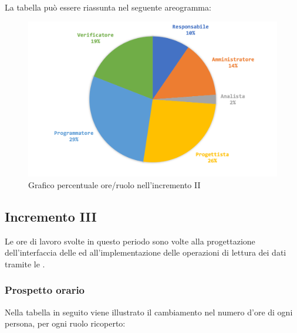 			La tabella può essere riassunta nel seguente areogramma:
			\begin{figure}[H]
				\centering
				\includegraphics[width=0.8\linewidth]{images/consuntivo/ConsIncr2-2.png}
				\caption{Grafico percentuale ore/ruolo nell'incremento II}
				\label{fig:grafico costi ruolo incremento II}
			\end{figure}

		
		\subsection{Incremento III }
		Le ore di lavoro svolte in questo periodo sono volte alla progettazione dell'interfaccia delle  ed all'implementazione delle operazioni di lettura dei dati tramite le .
		\subsubsection{Prospetto orario}
			Nella tabella in seguito viene illustrato il cambiamento nel numero d'ore di ogni persona, per ogni ruolo ricoperto:
			
